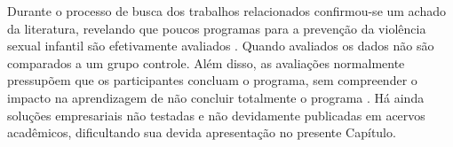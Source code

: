 Durante o processo de busca dos trabalhos relacionados confirmou-se um achado da literatura, revelando que poucos programas para a prevenção da violência sexual infantil são efetivamente avaliados \cite{sanderson2004child}. Quando avaliados os dados não são comparados a um grupo controle. Além disso, as avaliações normalmente pressupõem que os participantes concluam o programa, sem compreender o impacto na aprendizagem de não concluir totalmente o programa \cite{jones2020serious}. Há ainda soluções empresariais não testadas e não devidamente publicadas em acervos acadêmicos, dificultando sua devida apresentação no presente Capítulo. 

